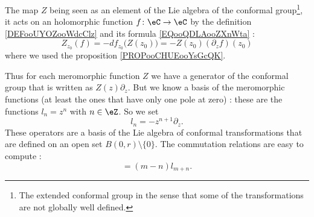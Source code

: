 \begin{normaltext}  \label{NORMooHDLPooQBfEif}
    The map \( Z\) being seen as an element of the Lie algebra of the conformal group\footnote{The extended conformal group in the sense that some of the transformations are not globally well defined.}, it acts on an holomorphic function \( f\colon \eC\to \eC \) by the definition \ref{DEFooUYOZooWdcClz} and its formula \eqref{EQooQDLAooZXnWta} :
    \begin{equation}
        Z_{z_0}(f)=-df_{z_0}\big( Z(z_0) \big)=-Z(z_0)(\partial_zf)(z_0)
    \end{equation}
    where we used the proposition \ref{PROPooCHUEooYsGcQK}.
\end{normaltext}

Thus for each meromorphic function \( Z\) we have a generator of the conformal group that is written as \( Z(z)\partial_z\). But we know a basis of the meromorphic functions (at least the ones that have only one pole at zero) : these are the functions \( l_n=z^n \) with \( n\in \eZ\). So we set
\begin{equation}
    l_n=-z^{n+1}\partial_z.
\end{equation}
These operators are a basis of the Lie algebra of conformal transformations that are defined on an open set \( B(0,r)\setminus \{ 0 \}\). The commutation relations are easy to compute :
\begin{equation}
    [l_m,l_n]=(m-n)l_{m+n}.
\end{equation}


